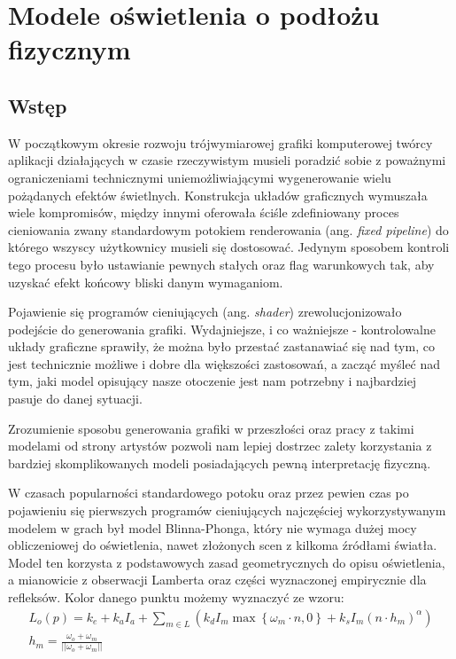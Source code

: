 \documentclass[../main.tex]{subfiles}
\begin{document}
\chapter{Modele oświetlenia o podłożu fizycznym}

\section{Wstęp}

W początkowym okresie rozwoju trójwymiarowej grafiki komputerowej twórcy aplikacji działających w czasie rzeczywistym musieli poradzić sobie z poważnymi ograniczeniami technicznymi uniemożliwiającymi wygenerowanie wielu pożądanych efektów świetlnych.
Konstrukcja układów graficznych wymuszała wiele kompromisów, między innymi oferowała ściśle zdefiniowany proces cieniowania zwany standardowym potokiem renderowania (ang. \textit{fixed pipeline}) do którego wszyscy użytkownicy musieli się dostosować. Jedynym sposobem kontroli tego procesu było ustawianie pewnych stałych oraz flag warunkowych tak, aby uzyskać efekt końcowy bliski danym wymaganiom.

Pojawienie się programów cieniujących (ang. \textit{shader}) zrewolucjonizowało podejście do generowania grafiki. Wydajniejsze, i co ważniejsze - kontrolowalne układy graficzne sprawiły, że można było przestać zastanawiać się nad tym, co jest technicznie możliwe i dobre dla większości zastosowań, a zacząć myśleć nad tym, jaki model opisujący nasze otoczenie jest nam potrzebny i najbardziej pasuje do danej sytuacji.

Zrozumienie sposobu generowania grafiki w przeszłości oraz pracy z takimi modelami od strony artystów pozwoli nam lepiej dostrzec zalety korzystania z bardziej skomplikowanych modeli posiadających pewną interpretację fizyczną.

W czasach popularności standardowego potoku oraz przez pewien czas po pojawieniu się pierwszych programów cieniujących najczęściej wykorzystywanym modelem w grach był model Blinna-Phonga, który nie wymaga dużej mocy obliczeniowej do oświetlenia, nawet złożonych scen z kilkoma źródłami światła. Model ten korzysta z podstawowych zasad geometrycznych do opisu oświetlenia, a mianowicie z obserwacji Lamberta oraz części wyznaczonej empirycznie dla refleksów. Kolor danego punktu możemy wyznaczyć ze wzoru:
\begin{equation}
\begin{gathered}
  L_o(p) = 
  	k_e + 
  	k_a I_a +
    \sum_{m \in L} \left( {
      k_d I_m \max\left\{{ \omega_m \cdot n, 0 }\right\} +
      k_s I_m (n \cdot h_m)^{\alpha}
    } \right) \\
    h_m = \frac{\omega_o+\omega_m}{||\omega_o+\omega_m||}
\end{gathered}
\label{eq:pbr_classic_shading}
\end{equation}
\end{document}
